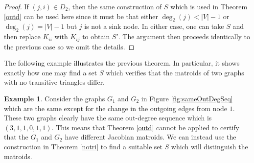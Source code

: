 \documentclass[12pt,reqno]{amsart}
\theoremstyle{plain}
\theoremstyle{definition}
\newtheorem{example}[theorem]{Example}
\begin{document}
\begin{proof}
If $(j,i)\in D_2$, then the same construction of $S$ which is used in Theorem \ref{outd} can be used here since it must be that either  $\deg_2(j) <|V|-1$ or $\deg_2(j)=|V|-1$ but $j$ is not a sink node. In either case, one can take $S$ and then replace $K_{ii}$ with $K_{ij}$ to obtain $S'$. The argument then proceeds identically to the previous case so we omit the details. 
\end{proof}

The following example illustrates the previous theorem. In particular, it shows exactly how one may find a set $S$ which verifies that the matroids of two graphs with no transitive triangles differ. 

\begin{example}\label{eg_ttf}
Consider the graphs $G_1$ and $G_2$ in Figure \ref{fig:sameOutDegSeq} which are the same except for the change in the outgoing edges from node $1$. These two graphs clearly have the same out-degree sequence which is $(3, 1, 1, 0, 1, 1)$. This means that Theorem \ref{outd} cannot be applied to certify that the $G_1$ and $G_2$ have different Jacobian matroids. We can instead use the construction in Theorem \ref{notri} to find a suitable set $S$ which will distinguish the matroids.


\end{example}
\end{document}
